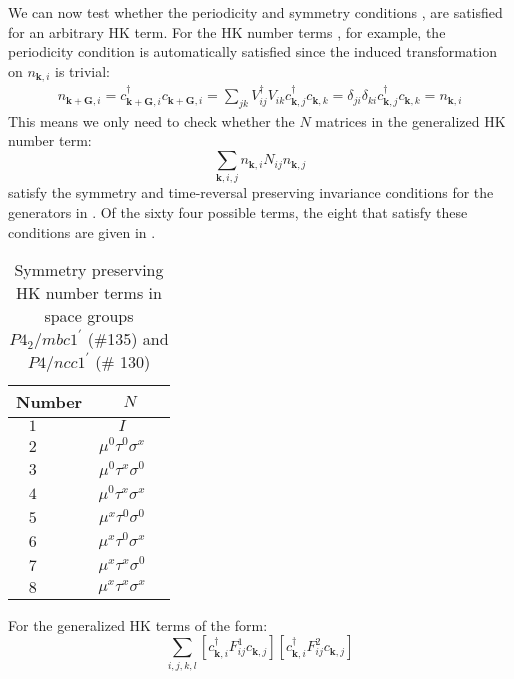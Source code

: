 \documentclass[prb,aps,amssymb,twocolumn,notitlepage]{revtex4-2}
\begin{document}
We can now test whether the periodicity  and symmetry conditions ,  are satisfied for an arbitrary HK term.
For the HK number terms , for example, the periodicity condition  is automatically satisfied since the induced transformation on $n_{\mathbf{k},i}$ is trivial:
\begin{align}
n_{\mathbf{k}+\mathbf{G},i}=c^\dagger_{\mathbf{k}+\mathbf{G},i}c_{\mathbf{k}+\mathbf{G},i}=\sum_{jk}V^\dagger_{ij}V_{ik}c^\dagger_{\mathbf{k},j}c_{\mathbf{k},k}=\delta_{ji}\delta_{ki}c^\dagger_{\mathbf{k},j}c_{\mathbf{k},k}=n_{\mathbf{k},i}
\end{align}
This means we only need to check whether the $N$ matrices in the generalized HK number term:
\begin{equation}
\sum_{\mathbf{k},i,j}n_{\mathbf{k},i}N_{ij}n_{\mathbf{k},j}
\end{equation}
satisfy the symmetry and time-reversal preserving invariance conditions for the generators in . 
Of the sixty four possible terms, the eight that satisfy these conditions are given in . 
\begin{table}[ht]
\caption{Symmetry preserving HK number terms in space groups $P4_2/mbc1^\prime$ (\#135) and $P4/ncc1^\prime$ (\# 130)} %
\centering %
\renewcommand*{\arraystretch}{1.4}
\begin{tabular}{c c c c} %
\hline\hline %
\multicolumn{2}{c}{Number} &\multicolumn{2}{c}{$N$}\\[0.5ex]
\hline %
$1$ & &$I$&\\
$2$ & &$\mu^0\tau^0\sigma^x$&\\
$3$ & &$\mu^0\tau^x\sigma^0$&\\
$4$ & &$\mu^0\tau^x\sigma^x$&\\
$5$ & &$\mu^x\tau^0\sigma^0$&\\
$6$ & &$\mu^x\tau^0\sigma^x$&\\
$7$ & &$\mu^x\tau^x\sigma^0$&\\
$8$ & &$\mu^x\tau^x\sigma^x$&\\
\hline %
\end{tabular}
\label{table:HKNterms} %
\end{table}
For the generalized HK terms of the form:
\begin{equation}
\sum_{i,j,k,l}\left[c^\dagger_{\mathbf{k},i}F^{1}_{ij}c_{\mathbf{k},j}\right]\left[c^\dagger_{\mathbf{k},i}F^{2}_{ij}c_{\mathbf{k},j}\right]
\end{equation}
\end{document}
